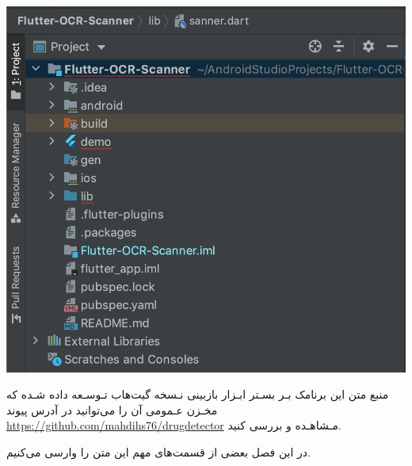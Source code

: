 


\begin{center}
\includegraphics[scale=0.75]{front/template/images/packages.png}
\end{center}

منبع متن این برنامک بـر بسـتر ابـزار بازبینی نـسخه گیت‌‌هاب تـوسـعه داده شـده که مخـزن عـمومی آن را می‌توانید در آدرس پیوند \href{https://github.com/mahdihs76/drugdetector}{https://github.com/mahdihs76/drugdetector} مـشاهـده و بررسی کنید.

در این فصل بعضی از قسمت‌های مهم این متن را وارسی می‌کنیم.

